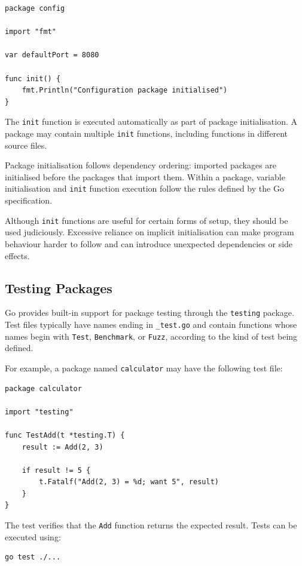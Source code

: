 \begin{lstlisting}
package config

import "fmt"

var defaultPort = 8080

func init() {
    fmt.Println("Configuration package initialised")
}
\end{lstlisting}

The \texttt{init} function is executed automatically as part of package initialisation. A package may contain multiple \texttt{init} functions, including functions in different source files.

Package initialisation follows dependency ordering: imported packages are initialised before the packages that import them. Within a package, variable initialisation and \texttt{init} function execution follow the rules defined by the Go specification.

Although \texttt{init} functions are useful for certain forms of setup, they should be used judiciously. Excessive reliance on implicit initialisation can make program behaviour harder to follow and can introduce unexpected dependencies or side effects.

\subsection{Testing Packages}

Go provides built-in support for package testing through the \texttt{testing} package. Test files typically have names ending in \texttt{\_test.go} and contain functions whose names begin with \texttt{Test}, \texttt{Benchmark}, or \texttt{Fuzz}, according to the kind of test being defined.

For example, a package named \texttt{calculator} may have the following test file:

\begin{lstlisting}
package calculator

import "testing"

func TestAdd(t *testing.T) {
    result := Add(2, 3)

    if result != 5 {
        t.Fatalf("Add(2, 3) = %d; want 5", result)
    }
}
\end{lstlisting}

The test verifies that the \texttt{Add} function returns the expected result. Tests can be executed using:

\begin{lstlisting}
go test ./...
\end{lstlisting}

